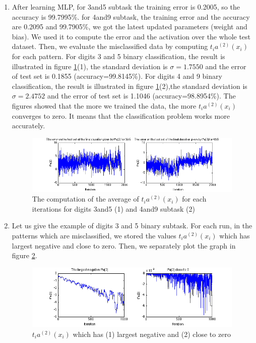 \begin{enumerate}
\item After learning MLP, for 3and5 subtask the training error is 0.2005, so the accuracy is 99.7995\%. for 4and9 subtask, the training error and the accuracy are 0.2095 and 99.7905\%, we got the latest updated parameters (weight and bias). We used it to compute the error and the activation over the whole test dataset. Then, we evaluate the misclassified data by computing $t_i a^{(2)} (x_i)$ for each pattern. For digits 3 and 5 binary classification, the result is illustrated in figure \ref{fig:testerror}(1), the standard deviation is $\sigma=1.7550$ and the error of test set is 0.1855 (accuracy=99.8145\%). For digits 4 and 9 binary classification, the result is illustrated in figure \ref{fig:testerror}(2),the standard deviation is $\sigma=2.4752$ and the error of test set is 1.1046 (accuracy=98.8954\%). 
The figures showed that the more we trained the data, the more $t_i a^{(2)} (x_i)$ converges to zero. It means that the classification problem works more accurately.
	\begin{figure}[htbp]
		\centering
		\includegraphics[width=0.99\textwidth]{plots/testerror.png}
		\caption{The computation of the average of $t_i a^{(2)} (x_i)$ for each iterations for digits 3and5 (1) and 4and9 subtask (2)}
		\label{fig:testerror}
	\end{figure}
	
\item Let us give the example of digits 3 and 5 binary subtask. For each run, in the patterns which are misclassified, we stored the values $t_i a^{(2)} (x_i)$ which has largest negative and close to zero. Then, we separately plot the graph in figure \ref{fig:largest_closetozero}.

	\begin{figure}[htbp]
		\centering
		\includegraphics[width=0.99\textwidth]{plots/largest_closetozero.png}
		\caption{$t_i a^{(2)} (x_i)$ which has (1) largest negative and (2) close to zero}
		\label{fig:largest_closetozero}
	\end{figure}

\end{enumerate}